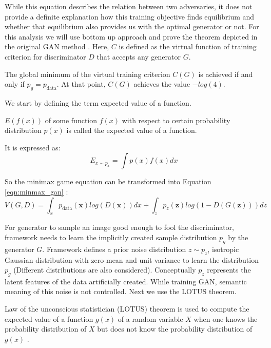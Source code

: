 While this equation describes the relation between two adversaries, it does not provide a
definite explanation how this training objective finds equilibrium and whether that equilibrium also
provides us with the optimal generator or not. For this analysis we will use bottom up approach and
prove the theorem depicted in the original GAN method \cite{Goodfellow:2014:GAN:2969033.2969125}. Here,
$C$ is defined as the virtual function of training criterion for discriminator $D$ that accepts any generator $G$.

\begin{theorem}
\label{thr:gan}
The global minimum of the virtual training criterion $C(G)$ is achieved if and only if $p_g = p_{\text{data}}$.
At that point, $C(G)$ achieves the value $-log(4)$.
\end{theorem} 
We start by defining the term expected value of a function. 

\begin{definition}
    $E(f(x))$ of some function $f(x)$ with respect to  certain probability distribution
$p(x)$ is called the expected value of a function.  
\end{definition}

It is expressed as:
\begin{equation}
    \label{eqn:ev}
    E_{x \sim p_x} = \int p(x) f(x) dx
\end{equation}

So the minimax game equation can be transformed into Equation \ref{eqn:minmax_gan} : 
\begin{equation}
    \label{eqn:minmax_gan}
    V( G, D) = \int_x p_{\text{data}}(\boldsymbol{x}) log(D(\boldsymbol{x})) dx + \int_z p_z(\boldsymbol{z}) log(1 - D(G(\boldsymbol{z}))) dz
\end{equation}

For generator to sample an image good enough to fool the discriminator, framework needs to learn the
implicitly created sample distribution $p_g$ by the generator $G$. Framework defines a prior noise
distribution $z \sim p_z$, isotropic Gaussian distribution with zero mean and unit variance to learn
the distribution $p_g$ (Different distributions are also considered). Conceptually $p_z$ represents the 
latent features of the data artificially created. While training GAN, semantic meaning of this noise is not controlled.
Next we use the LOTUS theorem.

\begin{theorem}
Law of the unconscious statistician (LOTUS) theorem is used to compute the expected value of a 
function $g(x)$ of a random variable $X$  when one knows the probability distribution of $X$ but 
does not know the probability distribution of $g(x)$ .
\end{theorem}


